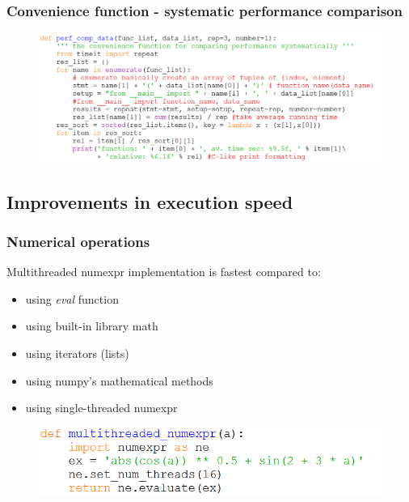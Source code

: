 \documentclass{beamer}
\begin{document}
\begin{frame}
\frametitle{Convenience function - systematic performance comparison}
\begin{figure}[H]
	\includegraphics[scale=0.4]{convenience_function.png}
\end{figure}
\end{frame}

\subsection{Improvements in execution speed}

\begin{frame}
\frametitle{Numerical operations}
Multithreaded numexpr implementation is fastest compared to:\\[3mm]
\begin{itemize}
	\item using \emph{eval} function
	\item using built-in library math
	\item using iterators (lists)
	\item using numpy's mathematical methods
	\item using single-threaded numexpr
\end{itemize}
\begin{figure}[H]
	\includegraphics[scale=0.6]{multithreaded_numexpr.png}
\end{figure}
\end{frame}
\end{document}
